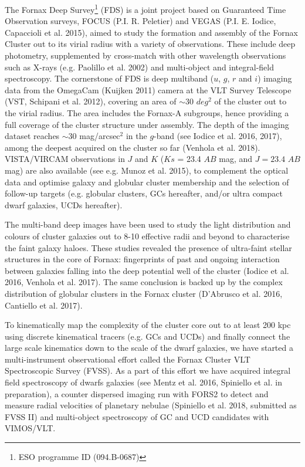 \documentclass[useAMS,usenatbib]{mn2e}
\begin{document}
The Fornax Deep Survey\footnote{ESO programme ID (094.B-0687)} (FDS) is a joint project based on Guaranteed Time Observation surveys, FOCUS (P.I. R. Peletier) and VEGAS (P.I. E. Iodice, Capaccioli et al. 2015), aimed to study the formation and assembly of the Fornax Cluster out to its virial radius with a variety of observations. These include
deep photometry, supplemented by cross-match with other wavelength observations such as  X-rays (e.g. Paolillo et al. 2002) and multi-object and integral-field spectroscopy.
The cornerstone of FDS is deep multiband ($u$, $g$, $r$ and $i$) imaging data from the OmegaCam (Kuijken 2011) camera at the VLT Survey Telescope (VST, Schipani et al. 2012), covering an area of $\sim30$ $deg^2$ of the cluster out to the virial radius. The area includes the Fornax-A subgroups, hence providing a full coverage of the cluster structure under assembly.  The depth of the imaging dataset reaches $\sim 30$ mag/arcsec$^2$ in the $g$-band (see Iodice et al. 2016, 2017), among the deepest acquired on the cluster so far (Venhola et al. 2018). VISTA/VIRCAM observations in $J$ and $K$ ($Ks$ = 23.4 $AB$ mag, and $J = 23.4$ $AB$ mag) are also available (see e.g. Munoz et al. 2015), to complement the optical data and optimise galaxy and globular cluster membership and the selection of follow-up targets (e.g. globular clusters, GCs hereafter, and/or ultra compact dwarf galaxies, UCDs hereafter). 

The multi-band deep images have been used to study the light distribution and colours of cluster galaxies out to 8-10 effective radii and beyond to characterise the faint galaxy haloes. These studies revealed the presence of ultra-faint stellar structures in the core of Fornax: fingerprints of past and ongoing interaction between galaxies falling into the deep potential well of the cluster (Iodice et al. 2016, Venhola et al. 2017). The same conclusion is backed up by the complex distribution of globular clusters in the Fornax cluster (D’Abrusco et al. 2016, Cantiello et al. 2017).

To kinematically map the complexity of the cluster core out to at least 200 kpc using discrete kinematical tracers (e.g. GCs and UCDs) and finally connect the large scale kinematics down to the scale of the dwarf galaxies, we have started a multi-instrument observational effort called the Fornax Cluster VLT Spectroscopic Survey (FVSS). As a part of this effort we have acquired integral field spectroscopy of dwarfs galaxies (see Mentz et al. 2016, Spiniello et al. in preparation), a counter dispersed imaging run with FORS2 to detect and measure radial velocities of planetary nebulae (Spiniello et al. 2018, submitted as FVSS II) and multi-object spectroscopy of GC and UCD candidates with VIMOS/VLT.
\end{document}
